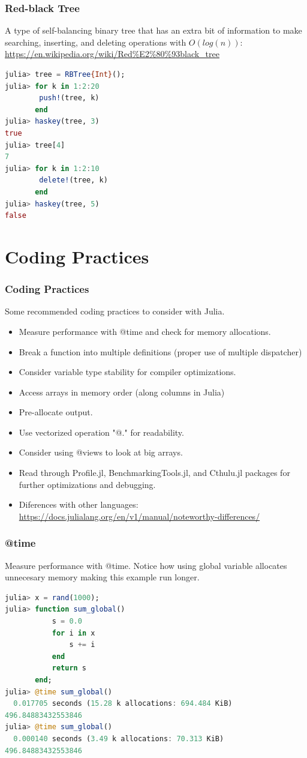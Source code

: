 \documentclass{beamer}
\begin{document}
\begin{frame}[fragile]
\frametitle{Red-black Tree}
A type of self-balancing binary tree that has an extra bit of information to make searching, inserting, and deleting operations with $O(log(n))$: \url{https://en.wikipedia.org/wiki/Red\%E2\%80\%93black_tree}
\begin{lstlisting}[language=julia]
julia> tree = RBTree{Int}();
julia> for k in 1:2:20
        push!(tree, k)
       end
julia> haskey(tree, 3)
true
julia> tree[4]
7
julia> for k in 1:2:10
        delete!(tree, k)
       end
julia> haskey(tree, 5)
false
\end{lstlisting}
\end{frame}

\section{Coding Practices}

\begin{frame}
\frametitle{Coding Practices}

Some recommended coding practices to consider with Julia.
\begin{itemize}
\item Measure performance with @time and check for memory allocations.
\item Break a function into multiple definitions (proper use of multiple dispatcher)
\item Consider variable type stability for compiler optimizations.
\item Access arrays in memory order (along columns in Julia) 
\item Pre-allocate output.
\item Use vectorized operation "@." for readability.
\item Consider using @views to look at big arrays.
\item Read through Profile.jl, BenchmarkingTools.jl, and Cthulu.jl packages for further optimizations and debugging.
\item Diferences with other languages: \url{https://docs.julialang.org/en/v1/manual/noteworthy-differences/}
\end{itemize}

\end{frame}

\begin{frame}[fragile]
\frametitle{@time}
Measure performance with @time. Notice how using global variable allocates unnecesary memory making this example run longer.
\begin{lstlisting}[language=julia]
julia> x = rand(1000);
julia> function sum_global()
           s = 0.0
           for i in x
               s += i
           end
           return s
       end;
julia> @time sum_global()
  0.017705 seconds (15.28 k allocations: 694.484 KiB)
496.84883432553846
julia> @time sum_global()
  0.000140 seconds (3.49 k allocations: 70.313 KiB)
496.84883432553846
\end{lstlisting}
\end{frame}
\end{document}
